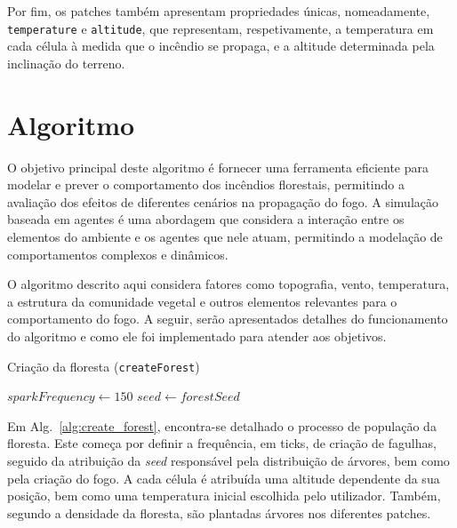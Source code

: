 Por fim, os patches também apresentam propriedades únicas, nomeadamente, \texttt{temperature} e \texttt{altitude}, que representam, respetivamente, a temperatura em cada célula à medida que o incêndio se propaga, e a altitude determinada pela inclinação do terreno.

\section{Algoritmo}\label{sec:algorithm}

O objetivo principal deste algoritmo é fornecer uma ferramenta eficiente para modelar e prever o comportamento dos incêndios florestais, permitindo a avaliação dos efeitos de diferentes cenários na propagação do fogo. A simulação baseada em agentes é uma abordagem que considera a interação entre os elementos do ambiente e os agentes que nele atuam, permitindo a modelação de comportamentos complexos e dinâmicos. 

O algoritmo descrito aqui considera fatores como topografia, vento, temperatura, a estrutura da comunidade vegetal e outros elementos relevantes para o comportamento do fogo. A seguir, serão apresentados detalhes do funcionamento do algoritmo e como ele foi implementado para atender aos objetivos.


\begin{algorithm}
    \caption{Criação da floresta (\texttt{createForest})}\label{alg:create_forest}
    $sparkFrequency \gets 150$\;
    $seed \gets forestSeed$\;
\end{algorithm}

Em Alg.~\ref{alg:create_forest}, encontra-se detalhado o processo de população da floresta. Este começa por definir a frequência, em ticks, de criação de fagulhas, seguido da atribuição da \textit{seed} responsável pela distribuição de árvores, bem como pela criação do fogo. A cada célula é atribuída uma altitude dependente da sua posição, bem como uma temperatura inicial escolhida pelo utilizador. Também, segundo a densidade da floresta, são plantadas árvores nos diferentes patches.


